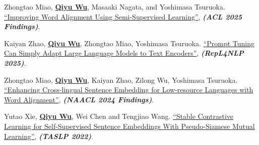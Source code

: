 \documentclass[10pt, letterpaper]{article}
\begin{document}
\begin{description}[leftmargin=3.5em,labelwidth=3em,labelsep=0.5em,topsep=0.10cm,itemsep=0.10cm,parsep=0pt]
        \item [{[S4]}] Zhongtao Miao, \underline{\textbf{Qiyu Wu}}, Masaaki Nagata, and Yoshimasa Tsuruoka. \href{https://aclanthology.org/2025.findings-acl.1020/}{``Improving Word Alignment Using Semi-Supervised Learning''}, \textit{\textbf{(ACL 2025 Findings)}}.
        \item [{[S3]}] Kaiyan Zhao, \underline{\textbf{Qiyu Wu}}, Zhongtao Miao, Yoshimasa Tsuruoka. \href{https://aclanthology.org/2025.repl4nlp-1.3/}{``Prompt Tuning Can Simply Adapt Large Language Models to Text Encoders''}, \textit{\textbf{(RepL4NLP 2025)}}.
        \item [{[S2]}] Zhongtao Miao, \underline{\textbf{Qiyu Wu}}, Kaiyan Zhao, Zilong Wu, Yoshimasa Tsuruoka. \href{https://aclanthology.org/2024.findings-naacl.204/}{``Enhancing Cross-lingual Sentence Embedding for Low-resource Languages with Word Alignment''}, \textit{\textbf{(NAACL 2024 Findings)}}.
        \item [{[S1]}] Yutao Xie, \underline{\textbf{Qiyu Wu}}, Wei Chen and Tengjiao Wang. \href{https://ieeexplore.ieee.org/abstract/document/9872078}{``Stable Contrastive Learning for Self-Supervised Sentence Embeddings With Pseudo-Siamese Mutual Learning''}, \textit{\textbf{(TASLP 2022)}}.
      \end{description}
\end{document}
